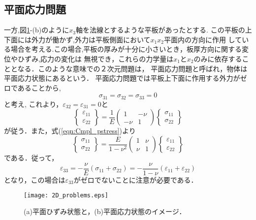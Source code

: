 \documentclass[10pt,a4j]{jarticle}
\begin{document}
\subsection{平面応力問題}
一方,図\ref{fig:fig6_2}-(b)のように$x_3$軸を法線とするような平板があったとする.
この平板の上下面には外力が働かず,外力は平板側面において$x_1x_2$平面内の方向に作用
している場合を考える.この場合,平板の厚みが十分に小さいとき，板厚方向に関する変位やひずみ,応力の変化は
無視でき，これらの力学量は$x_1$と$x_2$のみに依存することとなる．このような意味での２次元問題は，
平面応力問題と呼ばれ，物体は平面応力状態にあるという．
平面応力問題では平板上下面に作用する外力がゼロであることから, 
\begin{equation}
 \sigma_{31}=\sigma_{32}=\sigma_{33}=0
\end{equation}
と考え, これより，$\varepsilon_{32}=\varepsilon_{31}=0$と
\begin{equation}
	\left\{ 
	\begin{array}{*{20}{c}}
	\varepsilon _{11}\\
	\varepsilon _{22}
	\end{array}
	\right\} 
	= 
	\frac{1}{E}\left( 
	\begin{array}{*{20}{c}}
	1& - \nu \\
	 - \nu &1
	\end{array}
	\right)
	\left\{ 
	\begin{array}{*{20}{c}}
	\sigma _{11}\\
	\sigma _{22}
	\end{array} 
	\right\}
	\label{eqn:Cmpl_pstress}
\end{equation}
が従う．また，式(\ref{eqn:Cmpl_pstress})より
\begin{equation}
	\left\{ 
	\begin{array}{*{20}{c}}
	\sigma _{11}\\
	\sigma _{22}
	\end{array}
	\right\} 
	= 
	\frac{E}{1-\nu^2}\left( 
	\begin{array}{*{20}{c}}
	1&  \nu \\
	  \nu &1
	\end{array}
	\right)
	\left\{ 
	\begin{array}{*{20}{c}}
	\varepsilon _{11}\\
	\varepsilon _{22}
	\end{array} 
	\right\}
	\label{eqn:Hooke_pstress}
\end{equation}
である．従って，
\begin{equation}
	\varepsilon_{33}=-\frac{\nu}{E} \left( \sigma_{11}+\sigma_{22} \right)
	= -\frac{\nu}{1-\nu}\left(\varepsilon_{11}+\varepsilon_{22}\right)
\end{equation}
となり，この場合は$\varepsilon_{33}$がゼロでないことに注意が必要である．
\begin{figure}[h]
	\begin{center}
	\texttt{[image: 2D\_problems.eps]} 
	\end{center}
	\caption{
	(a)平面ひずみ状態と，(b)平面応力状態のイメージ．
	 } 
	\label{fig:fig6_2}
\end{figure}
\end{document}
